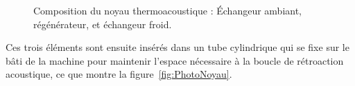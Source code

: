 \begin{figure}[!ht]
    \centering
	\begin{subfigure}{.32\textwidth}
		\centering
		\caption{}
		\label{fig:TacotPhotosNoyau_AHX}
	\end{subfigure}		
	\begin{subfigure}{.32\textwidth}
		\centering
		\caption{}
		\label{fig:TacotPhotosNoyau_Regen}
	\end{subfigure}	
	\begin{subfigure}{.32\textwidth}
		\centering
		\caption{}
		\label{fig:TacotPhotosNoyau_CHX}
	\end{subfigure}	    
    \caption{Composition du noyau thermoacoustique :  \'Echangeur ambiant,  régénérateur, et  échangeur froid.}
    \label{fig:TacotPhotosNoyau}
\end{figure}

Ces trois éléments sont ensuite insérés dans un tube cylindrique qui se fixe sur le bâti de la machine pour maintenir l'espace nécessaire à la boucle de rétroaction acoustique, ce que montre la figure~\ref{fig:PhotoNoyau}.


